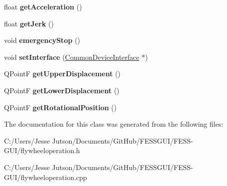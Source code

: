 \begin{DoxyCompactItemize}
float {\bfseries get\+Acceleration} ()
\item 
\hypertarget{class_flywheel_operation_ad443ef22229c1584da213f50234720bf}{}\label{class_flywheel_operation_ad443ef22229c1584da213f50234720bf} 
float {\bfseries get\+Jerk} ()
\item 
\hypertarget{class_flywheel_operation_a6a393e52299f7a48950f019d0f3db7de}{}\label{class_flywheel_operation_a6a393e52299f7a48950f019d0f3db7de} 
void {\bfseries emergency\+Stop} ()
\item 
\hypertarget{class_flywheel_operation_ab655d2757d24dbb605a8eb0c16bc0fe8}{}\label{class_flywheel_operation_ab655d2757d24dbb605a8eb0c16bc0fe8} 
void {\bfseries set\+Interface} (\hyperlink{class_common_device_interface}{Common\+Device\+Interface} $\ast$)
\item 
\hypertarget{class_flywheel_operation_a16ebc2fe8c3297350eaf9be2114a75c8}{}\label{class_flywheel_operation_a16ebc2fe8c3297350eaf9be2114a75c8} 
Q\+PointF {\bfseries get\+Upper\+Displacement} ()
\item 
\hypertarget{class_flywheel_operation_a2b9d24d0fbbf1d9cb79bb0aa54f6f6ae}{}\label{class_flywheel_operation_a2b9d24d0fbbf1d9cb79bb0aa54f6f6ae} 
Q\+PointF {\bfseries get\+Lower\+Displacement} ()
\item 
\hypertarget{class_flywheel_operation_a0e1ba213763760cf0128dfdc8436cfdf}{}\label{class_flywheel_operation_a0e1ba213763760cf0128dfdc8436cfdf} 
Q\+PointF {\bfseries get\+Rotational\+Position} ()
\end{DoxyCompactItemize}


The documentation for this class was generated from the following files\+:\begin{DoxyCompactItemize}
\item 
C\+:/\+Users/\+Jesse Jutson/\+Documents/\+Git\+Hub/\+F\+E\+S\+S\+G\+U\+I/\+F\+E\+S\+S-\/\+G\+U\+I/flywheeloperation.\+h\item 
C\+:/\+Users/\+Jesse Jutson/\+Documents/\+Git\+Hub/\+F\+E\+S\+S\+G\+U\+I/\+F\+E\+S\+S-\/\+G\+U\+I/flywheeloperation.\+cpp\end{DoxyCompactItemize}

